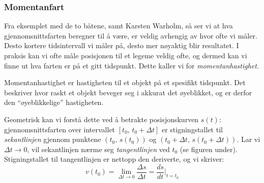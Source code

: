 \subsubsection{Momentanfart}
Fra eksemplet med de to båtene, samt Karsten Warholm, så ser vi at hva gjennomsnittsfarten beregner til å være, er veldig avhengig av hvor ofte vi måler. Desto kortere tidsintervall vi måler på, desto mer nøyaktig blir resultatet. I praksis kan vi ofte måle posisjonen til et legeme veldig ofte, og dermed kan vi finne ut hva farten er på et gitt tidspunkt. Dette kaller vi for \textit{momentanhastighet}. 

Momentanhastighet er hastigheten til et objekt på et spesifikt tidspunkt. Det beskriver hvor raskt et objekt beveger seg i akkurat det øyeblikket, og er derfor den ``øyeblikkelige'' hastigheten.

Geometrisk kan vi forstå dette ved å betrakte posisjonskurven $s(t)$: gjennomsnittsfarten over intervallet $[t_0,\,t_0+\Delta t]$ er stigningstallet til \textit{sekantlinjen} gjennom punktene $(t_0,\,s(t_0))$ og $(t_0+\Delta t,\,s(t_0+\Delta t))$. Lar vi $\Delta t \to 0$, vil sekantlinjen nærme seg \textit{tangentlinjen} ved $t_0$ (se figuren under). Stigningstallet til tangentlinjen er nettopp den deriverte, og vi skriver:
\[
  v(t_0)
  = \lim_{\Delta t \to 0} \frac{\Delta s}{\Delta t}
  = \frac{ds}{dt}\bigg|_{t=t_0}
\]


